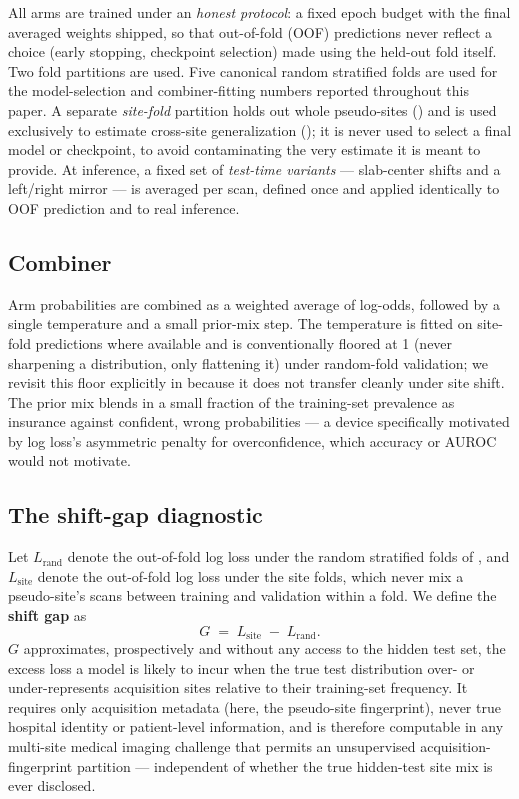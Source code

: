 \documentclass[10pt]{article}
\newcommand{\shiftgap}{\ensuremath{G}}
\newcommand{\lrand}{\ensuremath{L_{\text{rand}}}}
\newcommand{\lsite}{\ensuremath{L_{\text{site}}}}
\begin{document}
All arms are trained under an \emph{honest protocol}: a fixed epoch budget with the final averaged weights shipped, so that out-of-fold (OOF) predictions never reflect a choice (early stopping, checkpoint selection) made using the held-out fold itself. Two fold partitions are used. Five canonical random stratified folds are used for the model-selection and combiner-fitting numbers reported throughout this paper. A separate \emph{site-fold} partition holds out whole pseudo-sites () and is used exclusively to estimate cross-site generalization (); it is never used to select a final model or checkpoint, to avoid contaminating the very estimate it is meant to provide. At inference, a fixed set of \emph{test-time variants} --- slab-center shifts and a left/right mirror --- is averaged per scan, defined once and applied identically to OOF prediction and to real inference.

\subsection{Combiner}
\label{sec:combiner}

Arm probabilities are combined as a weighted average of log-odds, followed by a single temperature and a small prior-mix step. The temperature is fitted on site-fold predictions where available and is conventionally floored at 1 (never sharpening a distribution, only flattening it) under random-fold validation; we revisit this floor explicitly in  because it does not transfer cleanly under site shift. The prior mix blends in a small fraction of the training-set prevalence as insurance against confident, wrong probabilities --- a device specifically motivated by log loss's asymmetric penalty for overconfidence, which accuracy or AUROC would not motivate.

\subsection{The shift-gap diagnostic}
\label{sec:shiftgap}

Let \lrand{} denote the out-of-fold log loss under the random stratified folds of , and \lsite{} denote the out-of-fold log loss under the site folds, which never mix a pseudo-site's scans between training and validation within a fold. We define the \textbf{shift gap} as
\begin{equation}
\shiftgap \;=\; \lsite \;-\; \lrand.
\label{eq:shiftgap}
\end{equation}
\shiftgap{} approximates, prospectively and without any access to the hidden test set, the excess loss a model is likely to incur when the true test distribution over- or under-represents acquisition sites relative to their training-set frequency. It requires only acquisition metadata (here, the pseudo-site fingerprint), never true hospital identity or patient-level information, and is therefore computable in any multi-site medical imaging challenge that permits an unsupervised acquisition-fingerprint partition --- independent of whether the true hidden-test site mix is ever disclosed.
\end{document}
